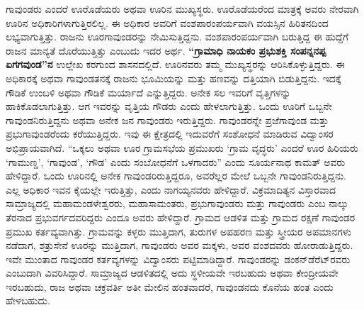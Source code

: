 ಗಾವುಂಡರು ಎಂದರೆ ಊರೊಡೆಯರು ಅಥವಾ ಊರಿನ ಮುಖ್ಯಸ್ಥರು. ಊರೊಡೆಯರೆಂದ ಮಾತ್ರಕ್ಕೆ ಅವರು ನೇರವಾಗಿ ಊರಿನ ಅಧಿಕಾರಿ\-ಗಳಾಗುತ್ತಿರಲಿಲ್ಲ. ಈ ಅಧಿಕಾರ ಅವರಿಗೆ ವಂಶಪಾರಂಪರ್ಯವಾಗಿ ವಯಸ್ಸಿನ ಹಿರಿತನದಿಂದ ಲಭ್ಯವಾಗುತ್ತಿತ್ತು. ರಾಜನು ಊರಗಾವುಂಡರನ್ನು ನೇಮಿಸುತ್ತಿದ್ದನು. ವಂಶಪಾರಂಪರ್ಯವಾಗಿ ಬರುತ್ತಿದ್ದ ಈ ಹುದ್ದೆಗೆ ರಾಜನ ಮಾನ್ಯತೆ ದೊರೆಯುತ್ತಿತ್ತು ಎಂಬುದು ಇದರ ಅರ್ಥ. \textbf{“ಗ್ರಾಮಾಧಿ ನಾಯಕಂ ಪ್ರಭುಶಕ್ತಿ ಸಂಪನ್ನನಪ್ಪ ಏಗಗವುಂಡ”ನ} ಉಲ್ಲೇಖ ಕರಗುಂದ ಶಾಸನದಲ್ಲಿದೆ. ಊರಿನವರು ತಮ್ಮ ಮುಖ್ಯಸ್ಥರನ್ನು ಆರಿಸಿಕೊಳ್ಳುತ್ತಿದ್ದರು. ಈ ಅಧಿಕಾರಕ್ಕೆ ಅಥವಾ ಗಾವುಂಡತನಕ್ಕೆ ರಾಜನು ಭೂಮಿಯನ್ನು ಮತ್ತು ಹಣವನ್ನು ದತ್ತಿಯಾಗಿ ಬಿಡುತ್ತಿದ್ದನು. ಇದಕ್ಕೆ ಗೌಡಿಕೆ ಉಂಬಳಿ ಅಥವಾ ಗೌಡಿಕೆ ಮರ್ಯಾದೆ ಎನ್ನುತ್ತಿದ್ದರು. ಅನೇಕ ಸಲ ಇವರಿಗೆ ವೃತ್ತಿಗಳನ್ನು ಹಾಕಿಕೊಡಲಾಗುತ್ತಿತ್ತು. ಆಗ ಇವರನ್ನು ವೃತ್ತಿಯ ಗೌಡರು ಎಂದು ಹೇಳಲಾಗುತ್ತಿತ್ತು. ಒಂದು ಊರಿಗೆ ಒಬ್ಬನೇ ಗಾವುಂಡನಿರುತ್ತಿದ್ದನು ಅಥವಾ ಅನೇಕ ಜನ ಗಾವುಂಡರು ಇರುತ್ತಿದ್ದರು. ಗಾವುಂಡರನ್ನೇ ಪ್ರಜೆಗಾವುಂಡ ಮತ್ತು ಪ್ರಭುಗಾವುಂಡರೆಂದು ಕರೆಯುತ್ತಿದ್ದರು. ಇವು ಈ ಕ್ಷೇತ್ರದಲ್ಲಿ ಇದುವರೆಗೆ ಸಂಶೋಧನೆ ಮಾಡಿರುವ ವಿದ್ವಾಂಸರ ಅಭಿಪ್ರಾಯವಾಗಿದೆ. “ಒಕ್ಕಲು ಅಥವಾ ಊರ ಗ್ರಾಮಸಭೆಯ ಪ್ರಮುಖರು ‘ಗ್ರಾಮ ವೃದ್ಧರು’ ಎಂದರೆ ಊರ ಹಿರಿಯರು ‘ಗಾಮುಣ್ಡ’, ‘ಗಾವುಂಡ’, ‘ಗೌಡ’ ಎಂದು ಸಂಬೋಧನೆಗೆ ಒಳಗಾದರು” ಎಂದು ಸೂರ್ಯನಾಥ ಕಾಮತ್​ ಅವರು ಹೇಳಿದ್ದಾರೆ. ಒಂದು ಊರಿನಲ್ಲಿ ಅನೇಕ ಗಾವುಂಡರಿರುತ್ತಿದ್ದರೂ, ಅವರೆಲ್ಲರ ಮೇಲೆ ಒಬ್ಬನೇ ಗಾವುಂಡನಿರುತ್ತಿದ್ದನು. ಎಲ್ಲ ಅಧಿಕಾರ ಇವನ ಕೈಯಲ್ಲೇ ಇರುತ್ತಿತ್ತು, ಎಂದು ನಾಗಯ್ಯನವರು ಹೇಳಿದ್ದಾರೆ. ವಿಕ್ರಮಾದಿತ್ಯನ ವಿಸ್ತಾರವಾದ ಸಾಮ್ರಾಜ್ಯದಲ್ಲಿ ಮಹಾಮಂಡಳೇಶ್ವರರು, ಮಹಾಸಾಮಂತರು, ಪ್ರಭುಗಾವುಂಡರು ಮತ್ತು ಗಾವುಂಡರು ಎಂಬ ನಾಲ್ಕು ತೆರನಾದ ಪ್ರಭುವರ್ಗದವರಿದ್ದರು ಎಂದೂ ಅವರು ಹೇಳಿದ್ದಾರೆ. ಗ್ರಾಮದ ಆಡಳಿತ ಮತ್ತು ಗ್ರಾಮದ ರಕ್ಷಣೆ ಗಾವುಂಡರ ಪ್ರಮುಖ ಕರ್ತವ್ಯವಾಗಿತ್ತು. ಗ್ರಾಮವನ್ನು ಕಳ್ಳರು ಮುತ್ತಿದಾಗ, ತುರುಗಳ ಅಪಹರಣ ಮತ್ತು ಸ್ತ್ರೀಯರ ಅಪಮಾನಗಳು ನಡೆದಾಗ, ಶತ್ರುಸೇನೆ ಊರನ್ನು ಮುತ್ತಿದಾಗ, ಗಾವುಂಡರು ಅವರ ಮಕ್ಕಳು, ಅವರ ವಂಶದವರು ಹೋರಾಡುತ್ತಿದ್ದರು. ಇವೇ ಮುಂತಾದ ಗಾವುಂಡರ ಕರ್ತವ್ಯಗಳನ್ನು ವಿದ್ವಾಂಸರು ಪಟ್ಟಿಮಾಡಿದ್ದಾರೆ. ಗಾವುಂಡರನ್ನು ಡಂಕನ್​ಡೆರೆಟ್​ರವರು  ಎಂಬುದಾಗಿ ವಿವರಿಸಿದ್ದಾರೆ. ಸಾಮ್ರಾಜ್ಯದ ಆಡಳಿತದಲ್ಲಿ ಅದು ಸ್ಥಳೀಯವೇ ಇರಬಹುದು ಅಥವಾ ಕೇಂದ್ರೀಯವೇ ಇರಬಹುದು, ರಾಜ ಅಥವಾ ಚಕ್ರವರ್ತಿ ಅತೀ ಮೇಲಿನ ಹಂತವಾದರೆ, ಗಾವುಂಡನದು ಕೊನೆಯ ಹಂತ ಎಂದು ಹೇಳಬಹುದು.

